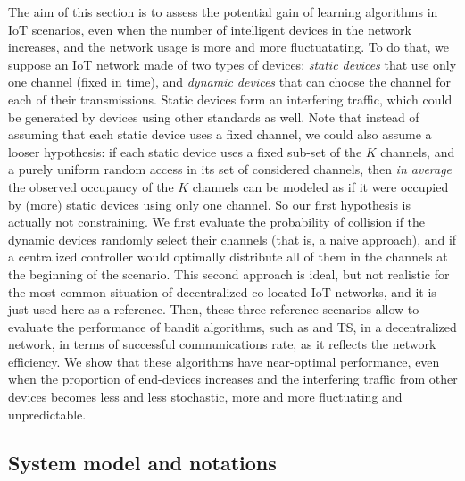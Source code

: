 The aim of this section is to assess the potential gain of learning algorithms in IoT scenarios, even when the number of intelligent devices in the network increases,
and the network usage is more and more fluctuatating.
To do that, we suppose an IoT network made of two types of devices: \emph{static devices} that use only one channel (fixed in time), and \emph{dynamic devices} that can choose the channel for each of their transmissions. Static devices form an interfering traffic, which could be generated by devices using other standards as well.
Note that instead of assuming that each static device uses a fixed channel, we could also assume a looser hypothesis: if each static device uses a fixed sub-set of the $K$ channels, and a purely uniform random access in its set of considered channels, then \emph{in average} the observed occupancy of the $K$ channels can be modeled as if it were occupied by (more) static devices using only one channel. So our first hypothesis is actually not constraining.
We first evaluate the probability of collision if the dynamic devices randomly select their channels (that is, a naive approach), and if a centralized controller would optimally distribute all of them in the channels at the beginning of the scenario.
This second approach is ideal, but not realistic for the most common situation of decentralized co-located IoT networks, and it is just used here as a reference.
Then, these three reference scenarios allow to evaluate the performance of bandit algorithms, such as \UCB{} and TS, in a decentralized network, in terms of successful communications rate, as it reflects the network efficiency.
We show that these algorithms have near-optimal performance, even when the proportion of end-devices increases and the interfering traffic from other devices becomes less and less stochastic, more and more fluctuating and unpredictable.




\subsection{System model and notations}\label{sub:41:systemModel}

